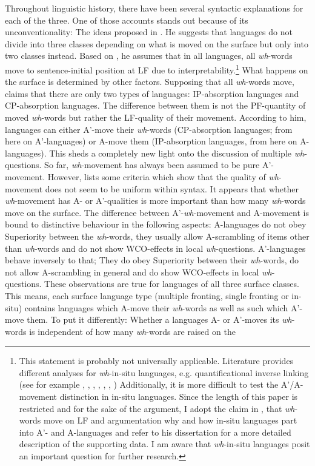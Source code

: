 \documentclass[output=paper,colorlinks,citecolor=brown]{langscibook}
\begin{document}
\noindent Throughout linguistic history, there have been  several syntactic explanations for each of the three. One of those accounts stands out because of its unconventionality: The ideas proposed in \citet{richards1997}. He suggests that languages do not divide into three classes depending on what is moved on the surface but only into two classes instead. Based on \citet{huang1982move}, he assumes that in all languages, all \textit{wh}-words move to sentence-initial position at LF due to interpretability.\footnote{This statement is probably not universally applicable. Literature provides different analyses for \textit{wh}-in-situ languages, e.g. quantificational inverse linking (see for example \citealp{may1978grammar}, \citealp{larson1985quantifying}, \citealp{may1985logical}, \citealp{chang1997wh}, \citealp{pollard1998unified}, \citealp{cooper2013quantification}, \citealp{may2017inverse}) Additionally, it is more difficult to test the A'/A-movement distinction in in-situ languages. Since the length of this paper is restricted and for the sake of the argument, I adopt the claim in \citet{huang1982move}, that \textit{wh}-words move on LF and \citet{richards1997} argumentation why and how in-situ languages part into A'- and A-languages and refer to his dissertation for a more detailed description of the supporting data. I am aware that \textit{wh}-in-situ languages posit an important question for further research.} What happens on the surface is determined by other factors. Supposing that all \textit{wh}-words move, \citet{richards1997} claims that there are only two types of languages: IP-absorption languages and CP-absorption languages. The difference between them is not the PF-quantity of moved \textit{wh}-words but rather the LF-quality of their movement. According to him, languages can either A'-move their \textit{wh}-words (CP-absorption languages; from here on A'-languages) or A-move them (IP-absorption languages, from here on A-languages). This sheds a completely new light onto the discussion of multiple \textit{wh}-questions. So far, \textit{wh}-movement has always been assumed to be pure A'-movement. However, \citet{richards1997} lists some criteria which show that the quality of \textit{wh}-movement does not seem to be uniform within syntax. It appears that whether \textit{wh}-movement has A- or A'-qualities is more important than how many \textit{wh}-words move on the surface. The difference between A'-\textit{wh}-movement and A-movement is bound to distinctive behaviour in the following aspects: A-languages do not obey Superiority between the \textit{wh}-words, they usually allow A-scrambling of items other than \textit{wh}-words and do not show WCO-effects in local \textit{wh}-questions. A'-languages behave inversely to that; They do obey Superiority between their \textit{wh}-words, do not allow A-scrambling in general and do show WCO-effects in local \textit{wh}-questions. These observations are true for languages of all three surface classes. This means, each surface language type (multiple fronting, single fronting or in-situ) contains languages which A-move their \textit{wh}-words as well as such which A'-move them. To put it differently: Whether a languages A- or A'-moves its \textit{wh}-words is independent of how many \textit{wh}-words are raised on the 
\end{document}
